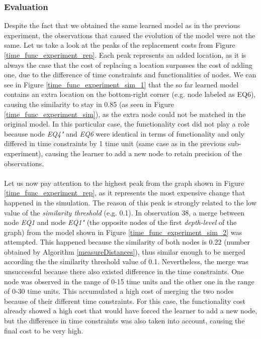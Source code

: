 \subsubsection{Evaluation}
Despite the fact that we obtained the same learned model as in the previous experiment, the observations that caused the evolution of the model were not the same. Let us take a look at the peaks of the replacement costs from Figure \ref{time_func_experiment_rep}. Each peak represents an added location, as it is always the case that the cost of replacing a location surpasses the cost of adding one, due to the difference of time constraints and functionalities of nodes.
%
We can see in Figure \ref{time_func_experiment_sim_1} that the so far learned model contains an extra location on the bottom-right corner (e.g. node labeled as EQ6), causing the similarity to stay in 0.85 (as seen in Figure \ref{time_func_experiment_sim}), as the extra node could not be matched in the original model. In this particular case, the functionality cost did not play a role because node \textit{EQ4"} and \textit{EQ6} were identical in terms of functionality and only differed in time constraints by 1 time unit (same case as in the previous sub-experiment), causing the learner to add a new node to retain precision of the observations. \\ \\
%
Let us now pay attention to the highest peak from the graph shown in Figure \ref{time_func_experiment_rep}, as it represents the most expensive change that happened in the simulation. The reason of this peak is strongly related to the low value of the \textit{similarity threshold} (e.g. 0.1). 
%
In observation 38, a merge between node \textit{EQ1} and node \textit{EQ1"} (the opposite nodes of the first \textit{depth-level} of the graph) from the model shown in Figure \ref{time_func_experiment_sim_2} was attempted. 
%
This happened because the similarity of both nodes is 0.22 (number obtained by Algorithm \ref{measureDistances}), thus similar enough to be merged according the the similarity threshold value of 0.1.
%
Nevertheless, the merge was unsuccessful because there also existed difference in the time constraints. One node was observed in the range of 0-15 time units and the other one in the range of 0-30 time units. This accumulated a high cost of merging the two nodes because of their different time constraints. 
%
For this case, the functionality cost already showed a high cost that would have forced the learner to add a new node, but the difference in time constraints was also taken into account, causing the final cost to be very high. 
